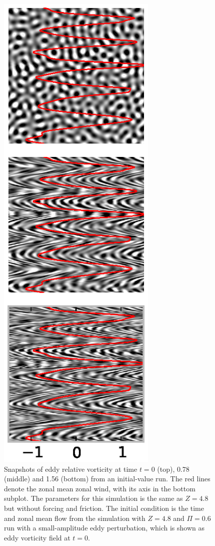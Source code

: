 \documentclass{ametsoc}
\begin{document}
\begin{figure}
\begin{center}
\includegraphics[width=3in]{eddy_vorticity_evolution}\caption{Snapshots of eddy relative vorticity at time $t=0$ (top), 0.78 (middle)
and 1.56 (bottom) from an initial-value run. The red lines denote
the zonal mean zonal wind, with its axis in the bottom subplot. The
parameters for this simulation is the same as $Z=4.8$ but without
forcing and friction. The initial condition is the time and zonal
mean flow from the simulation with $Z=4.8$ and $\Pi=0.6$ run with a
small-amplitude eddy perturbation, which is shown as eddy vorticity
field at $t=0$.}
\label{initial_value_run}
\end{center}
\end{figure}
\end{document}
